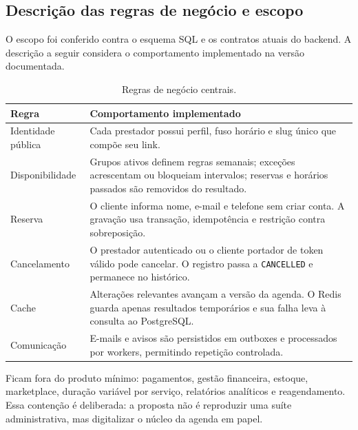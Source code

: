 \subsection{Descrição das regras de negócio e escopo}

O escopo foi conferido contra o esquema SQL e os contratos atuais do backend. A descrição a seguir considera o comportamento implementado na versão documentada.

\begin{table}[H]
\centering
\caption{Regras de negócio centrais.}
\label{tab:regras}
\small
\begin{tabularx}{\textwidth}{p{3.2cm}Y}
\toprule
\textbf{Regra} & \textbf{Comportamento implementado} \\
\midrule
Identidade pública & Cada prestador possui perfil, fuso horário e slug único que compõe seu link. \\
Disponibilidade & Grupos ativos definem regras semanais; exceções acrescentam ou bloqueiam intervalos; reservas e horários passados são removidos do resultado. \\
Reserva & O cliente informa nome, e-mail e telefone sem criar conta. A gravação usa transação, idempotência e restrição contra sobreposição. \\
Cancelamento & O prestador autenticado ou o cliente portador de token válido pode cancelar. O registro passa a \texttt{CANCELLED} e permanece no histórico. \\
Cache & Alterações relevantes avançam a versão da agenda. O Redis guarda apenas resultados temporários e sua falha leva à consulta ao PostgreSQL. \\
Comunicação & E-mails e avisos são persistidos em outboxes e processados por workers, permitindo repetição controlada. \\
\bottomrule
\end{tabularx}
\fontepropria
\end{table}

Ficam fora do produto mínimo: pagamentos, gestão financeira, estoque, marketplace, duração variável por serviço, relatórios analíticos e reagendamento. Essa contenção é deliberada: a proposta não é reproduzir uma suíte administrativa, mas digitalizar o núcleo da agenda em papel.

